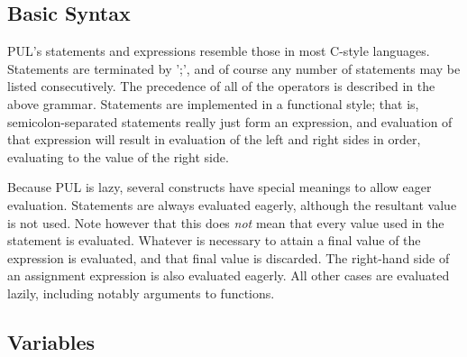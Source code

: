 \begin{comment}
<p class="P27">  plof_function = plof_comma



<p class="P27">  plof_obj = plof_obj_assigns

<p class="P27">  plof_obj = 



<p class="P27">  plof_obj_assigns = plof_obj_assign

<p class="P27">  plof_obj_assigns = plof_obj_assigns plof_obj_assign



<p class="P27">  plof_obj_assign = plof_identifier /;/

<p class="P27">  plof_obj_assign = plof_identifier /=/ plof_or /;/



<p class="P27">  plof_identifier = white /[A-Za-z_][A-Za-z0-9_]*/ token
\end{comment}



\subsection{Basic Syntax}

PUL's statements and expressions resemble those in most C-style languages. Statements are terminated by ';', and of course any number of statements may be listed consecutively. The precedence of all of the operators is described in the above grammar. Statements are implemented in a functional style; that is, semicolon-separated statements really just form an expression, and evaluation of that expression will result in evaluation of the left and right sides in order, evaluating to the value of the right side.

Because PUL is lazy, several constructs have special meanings to allow eager evaluation. Statements are always evaluated eagerly, although the resultant value is not used. Note however that this does \textit{not} mean that every value used in the statement is evaluated. Whatever is necessary to attain a final value of the expression is evaluated, and that final value is discarded. The right-hand side of an assignment expression is also evaluated eagerly. All other cases are evaluated lazily, including notably arguments to functions.



\subsection{Variables}

